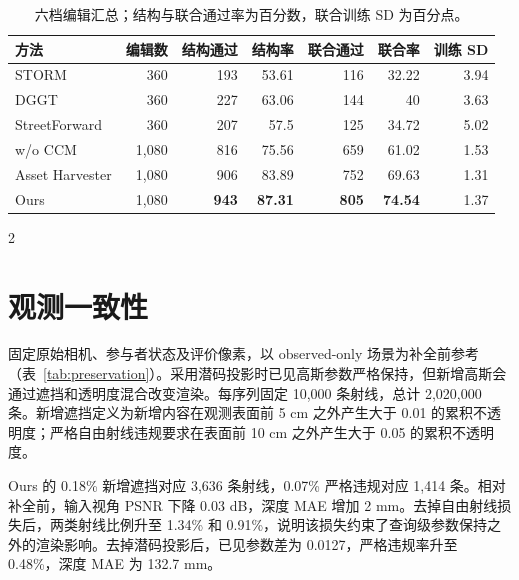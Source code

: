 \begin{table}[H]
\centering\small
\setlength{\tabcolsep}{3pt}
\caption{六档编辑汇总；结构与联合通过率为百分数，联合训练 SD 为百分点。}
\label{tab:extended-edit-summary}
\begin{tabular}{@{}lrrrrrr@{}}
\toprule
方法 & 编辑数 & 结构通过 & 结构率 & 联合通过 & 联合率 & 训练 SD \\
\midrule
STORM & 360 & 193 & 53.61 & 116 & 32.22 & 3.94 \\
DGGT & 360 & 227 & 63.06 & 144 & 40 & 3.63 \\
StreetForward & 360 & 207 & 57.5 & 125 & 34.72 & 5.02 \\
w/o CCM & 1,080 & 816 & 75.56 & 659 & 61.02 & 1.53 \\
Asset Harvester & 1,080 & 906 & 83.89 & 752 & 69.63 & 1.31 \\
Ours & 1,080 & \textbf{943} & \textbf{87.31} & \textbf{805} & \textbf{74.54} & 1.37 \\
\bottomrule
\end{tabular}
\end{table}
\begin{multicols}{2}

\section{观测一致性}
\label{sec:supp-preservation}

固定原始相机、参与者状态及评价像素，以 observed-only 场景为补全前参考（表~\ref{tab:preservation}）。采用潜码投影时已见高斯参数严格保持，但新增高斯会通过遮挡和透明度混合改变渲染。每序列固定 10,000 条射线，总计 2,020,000 条。新增遮挡定义为新增内容在观测表面前 5 cm 之外产生大于 0.01 的累积不透明度；严格自由射线违规要求在表面前 10 cm 之外产生大于 0.05 的累积不透明度。

Ours 的 0.18\% 新增遮挡对应 3,636 条射线，0.07\% 严格违规对应 1,414 条。相对补全前，输入视角 PSNR 下降 0.03 dB，深度 MAE 增加 2 mm。去掉自由射线损失后，两类射线比例升至 1.34\% 和 0.91\%，说明该损失约束了查询级参数保持之外的渲染影响。去掉潜码投影后，已见参数差为 0.0127，严格违规率升至 0.48\%，深度 MAE 为 132.7 mm。

\end{multicols}
